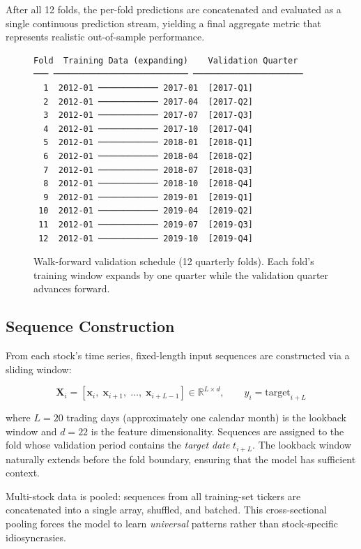 \noindent
After all 12 folds, the per-fold predictions are concatenated and evaluated as a
single continuous prediction stream, yielding a final aggregate metric that
represents realistic out-of-sample performance.

\begin{figure}[htbp]
\centering
\begin{verbatim}
Fold  Training Data (expanding)    Validation Quarter
─── ─────────────────────────── ──────────────────────
  1  2012-01 ──────────── 2017-01  [2017-Q1]
  2  2012-01 ──────────── 2017-04  [2017-Q2]
  3  2012-01 ──────────── 2017-07  [2017-Q3]
  4  2012-01 ──────────── 2017-10  [2017-Q4]
  5  2012-01 ──────────── 2018-01  [2018-Q1]
  6  2012-01 ──────────── 2018-04  [2018-Q2]
  7  2012-01 ──────────── 2018-07  [2018-Q3]
  8  2012-01 ──────────── 2018-10  [2018-Q4]
  9  2012-01 ──────────── 2019-01  [2019-Q1]
 10  2012-01 ──────────── 2019-04  [2019-Q2]
 11  2012-01 ──────────── 2019-07  [2019-Q3]
 12  2012-01 ──────────── 2019-10  [2019-Q4]
\end{verbatim}
\caption{Walk-forward validation schedule (12 quarterly folds).  Each fold's
training window expands by one quarter while the validation quarter advances
forward.}
\label{fig:walk-forward}
\end{figure}

\subsection{Sequence Construction}
\label{sec:sequences}

From each stock's time series, fixed-length input sequences are constructed via a
sliding window:

\begin{equation}
  \mathbf{X}_i = [\mathbf{x}_{i},\; \mathbf{x}_{i+1},\; \ldots,\;
    \mathbf{x}_{i+L-1}] \in \mathbb{R}^{L \times d}, \qquad
  y_i = \text{target}_{i+L}
\end{equation}

where $L = 20$ trading days (approximately one calendar month) is the lookback
window and $d = 22$ is the feature dimensionality.  Sequences are assigned to
the fold whose validation period contains the \emph{target date} $t_{i+L}$.
The lookback window naturally extends before the fold boundary, ensuring that
the model has sufficient context.

Multi-stock data is pooled: sequences from all training-set tickers are
concatenated into a single array, shuffled, and batched.  This cross-sectional
pooling forces the model to learn \emph{universal} patterns rather than
stock-specific idiosyncrasies.

